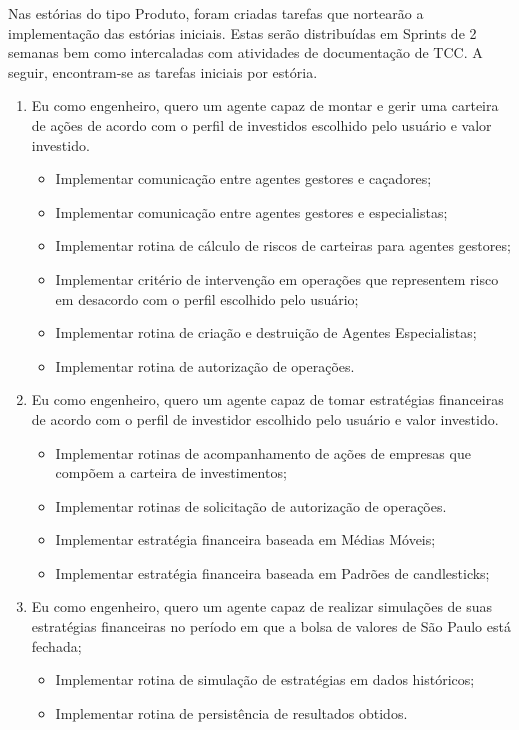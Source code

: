 Nas estórias do tipo Produto, foram criadas tarefas que nortearão a implementação das estórias iniciais. Estas serão distribuídas em Sprints de 2 semanas bem como intercaladas com atividades de documentação de TCC. A seguir, encontram-se as tarefas iniciais por estória.

\begin{enumerate}
\item Eu como engenheiro, quero um agente capaz de montar e gerir uma carteira de ações de acordo com o perfil de investidos escolhido pelo usuário e valor investido.
		\begin{itemize}
		\item Implementar comunicação entre agentes gestores e caçadores;
		\item Implementar comunicação entre agentes gestores e especialistas;
		\item Implementar rotina de cálculo de riscos de carteiras para agentes gestores;
		\item Implementar critério de intervenção em operações que representem risco em desacordo com o perfil escolhido pelo usuário;
		\item Implementar rotina de criação e destruição de Agentes Especialistas;
		\item Implementar rotina de autorização de operações.
		\end{itemize}
\item Eu como engenheiro, quero um agente capaz de tomar estratégias financeiras de acordo com o perfil de investidor escolhido pelo usuário e valor investido.
		\begin{itemize}
		\item Implementar rotinas de acompanhamento de ações de empresas que compõem a carteira de investimentos;
		\item Implementar rotinas de solicitação de autorização de operações.
		\item Implementar estratégia financeira baseada em Médias Móveis;
		\item Implementar estratégia financeira baseada em Padrões de candlesticks; 
		\end{itemize}
\item Eu como engenheiro, quero um agente capaz de realizar simulações de suas estratégias financeiras no período em que a bolsa de valores de São Paulo está fechada;
		\begin{itemize}
		\item Implementar rotina de simulação de estratégias em dados históricos;
		\item Implementar rotina de persistência de resultados obtidos.

\end{itemize}
\end{enumerate}
